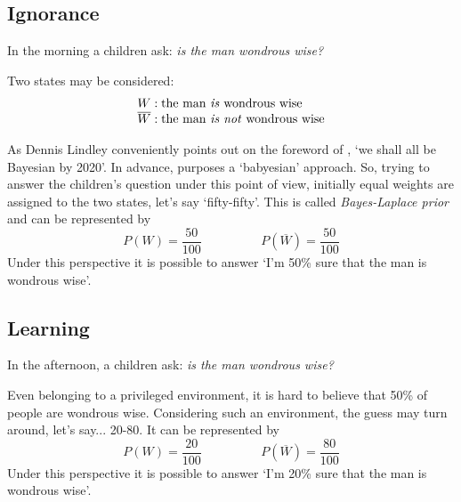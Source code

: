 \documentclass[a4paper]{exam}
\theoremstyle{plain}
\begin{document}
\subsection{Ignorance}

In the morning a children ask: \textit{is the man wondrous wise?}
\vspace{.5cm}

Two states may be considered: 
\[
  \begin{array}{l}
      W: \text{the man \textit{is} wondrous wise} \\ 
      \overline{W}: \text{the man \textit{is not} wondrous wise} \\ 
  \end{array} \]
      
As Dennis Lindley conveniently points out on the foreword of \cite[p. ix]{finetti1974theory}, `we shall all be Bayesian by 2020'. In advance, \cite{ferrie2019Bayesian} purposes a `babyesian' approach. So, trying to answer the children's question under this point of view, initially equal weights are assigned to the two states, let's say `fifty-fifty'. This is called \textit{Bayes-Laplace prior} and can be represented by \[ P(W) = \frac{50}{100} \hspace{2cm} P(\overline{W}) = \frac{50}{100} \] Under this perspective it is possible to answer `I'm 50\% sure that the man is wondrous wise'.



\subsection{Learning}

In the afternoon, a children ask: \textit{is the man wondrous wise?}
\vspace{.5cm}

Even belonging to a privileged environment, it is hard to believe that 50\% of people are wondrous wise. Considering such an environment, the guess may turn around, let's say... 20-80. It can be represented by \[ P(W) = \frac{20}{100} \hspace{2cm} P(\overline{W}) = \frac{80}{100} \] Under this perspective it is possible to answer `I'm 20\% sure that the man is wondrous wise'.
\end{document}
